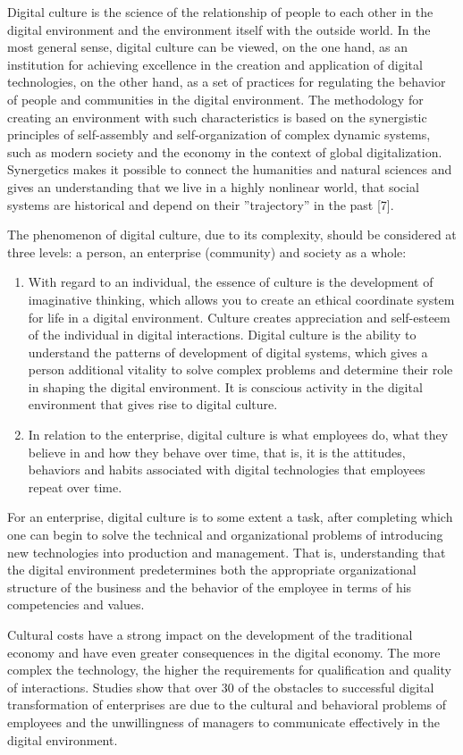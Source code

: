 \documentclass{article}
\begin{document}
\begin{multicols}{2}
Digital culture is the science of the relationship of
people to each other in the digital environment and the
environment itself with the outside world. In the most
general sense, digital culture can be viewed, on the one
hand, as an institution for achieving excellence in the
creation and application of digital technologies, on the
other hand, as a set of practices for regulating the behavior of people and communities in the digital environment.
The methodology for creating an environment with such
characteristics is based on the synergistic principles of
self-assembly and self-organization of complex dynamic
systems, such as modern society and the economy in
the context of global digitalization. Synergetics makes it
possible to connect the humanities and natural sciences
and gives an understanding that we live in a highly nonlinear world, that social systems are historical and depend
on their ”trajectory” in the past [7].

The phenomenon of digital culture, due to its complexity, should be considered at three levels: a person,
an enterprise (community) and society as a whole:
\vspace{-8pt}
\begin{enumerate}
\setlength\itemsep{-4pt}
\item[1)]  With regard to an individual, the essence of culture
is the development of imaginative thinking, which
allows you to create an ethical coordinate system
for life in a digital environment. Culture creates
appreciation and self-esteem of the individual in
digital interactions. Digital culture is the ability to
understand the patterns of development of digital
systems, which gives a person additional vitality to
solve complex problems and determine their role
in shaping the digital environment. It is conscious
activity in the digital environment that gives rise
to digital culture.
\item[2)] In relation to the enterprise, digital culture is what
employees do, what they believe in and how they
behave over time, that is, it is the attitudes, behaviors and habits associated with digital technologies
that employees repeat over time.
\end{enumerate}
\vspace{-8pt}
For an enterprise, digital culture is to some extent a
task, after completing which one can begin to solve the
technical and organizational problems of introducing new
technologies into production and management. That is,
understanding that the digital environment predetermines
both the appropriate organizational structure of the business and the behavior of the employee in terms of his
competencies and values.

Cultural costs have a strong impact on the development
of the traditional economy and have even greater consequences in the digital economy. The more complex the
technology, the higher the requirements for qualification
and quality of interactions. Studies show that over 30%
of the obstacles to successful digital transformation of
enterprises are due to the cultural and behavioral problems of employees and the unwillingness of managers to
communicate effectively in the digital environment.
\end{multicols}
\end{document}
